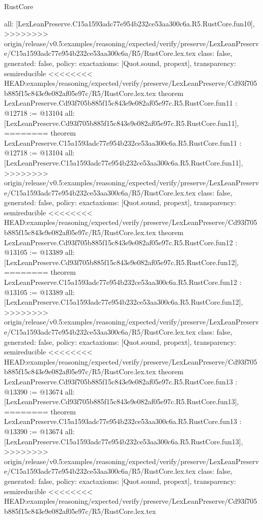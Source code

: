 \begin{lexlean}{RustCore}
\begin{coremodule}
{\begin{coremodule}
{{{{{{{{{{{{{{  all: [LexLeanPreserve.C15a1593adc77e954b232ce53aa300c6a.R5.RustCore.fun10],
>>>>>>>> origin/release/v0.5:examples/reasoning/expected/verify/preserve/LexLeanPreserve/C15a1593adc77e954b232ce53aa300c6a/R5/RustCore.lex.tex
  class: false,
  generated: false,
  policy: exact{axioms: [Quot.sound, propext]},
  transparency: semireducible
}
<<<<<<<< HEAD:examples/reasoning/expected/verify/preserve/LexLeanPreserve/Cd93f705b885f15c843e9e082af05e97c/R5/RustCore.lex.tex
theorem LexLeanPreserve.Cd93f705b885f15c843e9e082af05e97c.R5.RustCore.fun11 : @12718 := @13104 {
  all: [LexLeanPreserve.Cd93f705b885f15c843e9e082af05e97c.R5.RustCore.fun11],
========
theorem LexLeanPreserve.C15a1593adc77e954b232ce53aa300c6a.R5.RustCore.fun11 : @12718 := @13104 {
  all: [LexLeanPreserve.C15a1593adc77e954b232ce53aa300c6a.R5.RustCore.fun11],
>>>>>>>> origin/release/v0.5:examples/reasoning/expected/verify/preserve/LexLeanPreserve/C15a1593adc77e954b232ce53aa300c6a/R5/RustCore.lex.tex
  class: false,
  generated: false,
  policy: exact{axioms: [Quot.sound, propext]},
  transparency: semireducible
}
<<<<<<<< HEAD:examples/reasoning/expected/verify/preserve/LexLeanPreserve/Cd93f705b885f15c843e9e082af05e97c/R5/RustCore.lex.tex
theorem LexLeanPreserve.Cd93f705b885f15c843e9e082af05e97c.R5.RustCore.fun12 : @13105 := @13389 {
  all: [LexLeanPreserve.Cd93f705b885f15c843e9e082af05e97c.R5.RustCore.fun12],
========
theorem LexLeanPreserve.C15a1593adc77e954b232ce53aa300c6a.R5.RustCore.fun12 : @13105 := @13389 {
  all: [LexLeanPreserve.C15a1593adc77e954b232ce53aa300c6a.R5.RustCore.fun12],
>>>>>>>> origin/release/v0.5:examples/reasoning/expected/verify/preserve/LexLeanPreserve/C15a1593adc77e954b232ce53aa300c6a/R5/RustCore.lex.tex
  class: false,
  generated: false,
  policy: exact{axioms: [Quot.sound, propext]},
  transparency: semireducible
}
<<<<<<<< HEAD:examples/reasoning/expected/verify/preserve/LexLeanPreserve/Cd93f705b885f15c843e9e082af05e97c/R5/RustCore.lex.tex
theorem LexLeanPreserve.Cd93f705b885f15c843e9e082af05e97c.R5.RustCore.fun13 : @13390 := @13674 {
  all: [LexLeanPreserve.Cd93f705b885f15c843e9e082af05e97c.R5.RustCore.fun13],
========
theorem LexLeanPreserve.C15a1593adc77e954b232ce53aa300c6a.R5.RustCore.fun13 : @13390 := @13674 {
  all: [LexLeanPreserve.C15a1593adc77e954b232ce53aa300c6a.R5.RustCore.fun13],
>>>>>>>> origin/release/v0.5:examples/reasoning/expected/verify/preserve/LexLeanPreserve/C15a1593adc77e954b232ce53aa300c6a/R5/RustCore.lex.tex
  class: false,
  generated: false,
  policy: exact{axioms: [Quot.sound, propext]},
  transparency: semireducible
}
<<<<<<<< HEAD:examples/reasoning/expected/verify/preserve/LexLeanPreserve/Cd93f705b885f15c843e9e082af05e97c/R5/RustCore.lex.tex
}}}}}}}}}}}}}}}}
\end{coremodule}}
\end{coremodule}
\end{lexlean}
